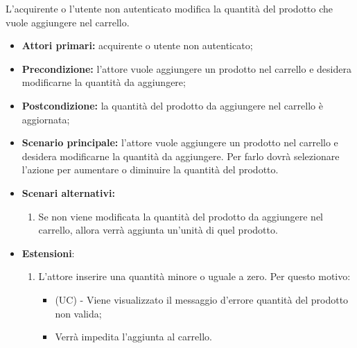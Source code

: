 
L'acquirente o l'utente non autenticato modifica la quantità del prodotto che vuole aggiungere nel carrello.
\begin{itemize}
	\item \textbf{Attori primari:} acquirente o utente non autenticato;
	\item \textbf{Precondizione:} l'attore vuole aggiungere un prodotto nel carrello e desidera modificarne la quantità da aggiungere;
	\item \textbf{Postcondizione:} la quantità del prodotto da aggiungere nel carrello è aggiornata;
	\item \textbf{Scenario principale:} l'attore vuole aggiungere un prodotto nel carrello e desidera modificarne la quantità da aggiungere. Per farlo dovrà selezionare l'azione per aumentare o diminuire la quantità del prodotto.
	\item \textbf{Scenari alternativi:}
	\begin{enumerate}[label=\lett]
        \item Se non viene modificata la quantità del prodotto da aggiungere nel carrello, allora verrà aggiunta un'unità di quel prodotto.
    \end{enumerate}
	\item \textbf{Estensioni}:
	\begin{enumerate}[label=\lett]
        \item L'attore inserire una quantità minore o uguale a zero. Per questo motivo:
        \begin{itemize}
            \item (UC) - Viene visualizzato il messaggio d'errore quantità del prodotto non valida;
            \item Verrà impedita l'aggiunta al carrello.
        \end{itemize}
	\end{enumerate}
\end{itemize}


